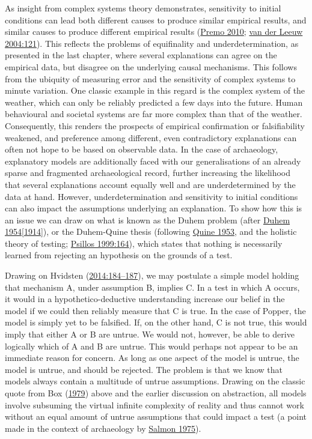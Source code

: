 \documentclass[
  12pt,
  a4paper,
  oneside]{book}
\begin{document}
As insight from complex systems theory demonstrates, sensitivity to initial conditions can lead both different causes to produce similar empirical results, and similar causes to produce different empirical results (\protect\hyperlink{ref-premo2010}{Premo 2010}; \protect\hyperlink{ref-vanderleeuw2004}{van der Leeuw 2004:121}). This reflects the problems of equifinality and underdetermination, as presented in the last chapter, where several explanations can agree on the empirical data, but disagree on the underlying causal mechanisms. This follows from the ubiquity of measuring error and the sensitivity of complex systems to minute variation. One classic example in this regard is the complex system of the weather, which can only be reliably predicted a few days into the future. Human behavioural and societal systems are far more complex than that of the weather. Consequently, this renders the prospects of empirical confirmation or falsifiability weakened, and preference among different, even contradictory explanations can often not hope to be based on observable data. In the case of archaeology, explanatory models are additionally faced with our generalisations of an already sparse and fragmented archaeological record, further increasing the likelihood that several explanations account equally well and are underdetermined by the data at hand. However, underdetermination and sensitivity to initial conditions can also impact the assumptions underlying an explanation. To show how this is an issue we can draw on what is known as the Duhem problem (after \protect\hyperlink{ref-duhem1914}{Duhem 1954{[}1914{]}}), or the Duhem-Quine thesis (following \protect\hyperlink{ref-quine1953}{Quine 1953}, and the holistic theory of testing; \protect\hyperlink{ref-psillos1999}{Psillos 1999:164}), which states that nothing is necessarily learned from rejecting an hypothesis on the grounds of a test.

Drawing on Hvidsten (\protect\hyperlink{ref-hvidsten2014}{2014:184--187}), we may postulate a simple model holding that mechanism A, under assumption B, implies C. In a test in which A occurs, it would in a hypothetico-deductive understanding increase our belief in the model if we could then reliably measure that C is true. In the case of Popper, the model is simply yet to be falsified. If, on the other hand, C is not true, this would imply that either A or B are untrue. We would not, however, be able to derive logically which of A and B are untrue. This would perhaps not appear to be an immediate reason for concern. As long as one aspect of the model is untrue, the model is untrue, and should be rejected. The problem is that we know that models always contain a multitude of untrue assumptions. Drawing on the classic quote from Box (\protect\hyperlink{ref-box1979}{1979}) above and the earlier discussion on abstraction, all models involve subsuming the virtual infinite complexity of reality and thus cannot work without an equal amount of untrue assumptions that could impact a test (a point made in the context of archaeology by \protect\hyperlink{ref-salmon1975}{Salmon 1975}).
\end{document}
